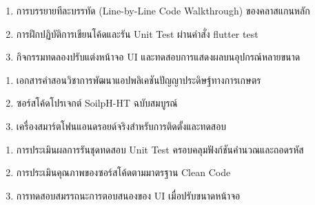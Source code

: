 \begin{tcolorbox}[
    enhanced, breakable,
    colback=white, colframe=rbruNavy,
    fonttitle=\bfseries\color{white},
    title={3. วิธีสอนและกิจกรรมการเรียนการสอน},
    arc=1.5mm, boxrule=0.8pt, leftrule=3.5mm
]
\begin{enumerate}
    \item การบรรยายทีละบรรทัด (Line-by-Line Code Walkthrough) ของคลาสแกนหลัก
    \item การฝึกปฏิบัติการเขียนโค้ดและรัน Unit Test ผ่านคำสั่ง flutter test
    \item กิจกรรมทดลองปรับแต่งหน้าจอ UI และทดสอบการแสดงผลบนอุปกรณ์หลายขนาด
\end{enumerate}
\end{tcolorbox}

\begin{tcolorbox}[
    enhanced, breakable,
    colback=white, colframe=rbruNavy,
    fonttitle=\bfseries\color{white},
    title={4. สื่อการเรียนการสอน},
    arc=1.5mm, boxrule=0.8pt, leftrule=3.5mm
]
\begin{enumerate}
    \item เอกสารคำสอนวิชาการพัฒนาแอปพลิเคชันปัญญาประดิษฐ์ทางการเกษตร
    \item ซอร์สโค้ดโปรเจกต์ SoilpH-HT ฉบับสมบูรณ์
    \item เครื่องสมาร์ตโฟนแอนดรอยด์จริงสำหรับการติดตั้งและทดสอบ
\end{enumerate}
\end{tcolorbox}

\begin{tcolorbox}[
    enhanced, breakable,
    colback=white, colframe=rbruNavy,
    fonttitle=\bfseries\color{white},
    title={5. การวัดและประเมินผล},
    arc=1.5mm, boxrule=0.8pt, leftrule=3.5mm
]
\begin{enumerate}
    \item การประเมินผลการรันชุดทดสอบ Unit Test ครอบคลุมฟังก์ชันคำนวณและถอดรหัส
    \item การประเมินคุณภาพของซอร์สโค้ดตามมาตรฐาน Clean Code
    \item การทดสอบสมรรถนะการตอบสนองของ UI เมื่อปรับขนาดหน้าจอ
\end{enumerate}
\end{tcolorbox}

\clearpage

